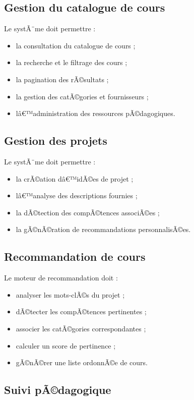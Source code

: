 ﻿\documentclass[12pt,a4paper]{report}
\begin{document}
\subsection{Gestion du catalogue de cours}

Le systÃ¨me doit permettre :
\begin{itemize}
    \item la consultation du catalogue de cours ;
    \item la recherche et le filtrage des cours ;
    \item la pagination des rÃ©sultats ;
    \item la gestion des catÃ©gories et fournisseurs ;
    \item lâ€™administration des ressources pÃ©dagogiques.
\end{itemize}

\subsection{Gestion des projets}

Le systÃ¨me doit permettre :
\begin{itemize}
    \item la crÃ©ation dâ€™idÃ©es de projet ;
    \item lâ€™analyse des descriptions fournies ;
    \item la dÃ©tection des compÃ©tences associÃ©es ;
    \item la gÃ©nÃ©ration de recommandations personnalisÃ©es.
\end{itemize}

\subsection{Recommandation de cours}

Le moteur de recommandation doit :
\begin{itemize}
    \item analyser les mots-clÃ©s du projet ;
    \item dÃ©tecter les compÃ©tences pertinentes ;
    \item associer les catÃ©gories correspondantes ;
    \item calculer un score de pertinence ;
    \item gÃ©nÃ©rer une liste ordonnÃ©e de cours.
\end{itemize}

\subsection{Suivi pÃ©dagogique}
\end{document}

